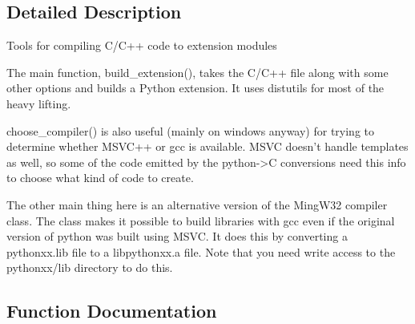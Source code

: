 \subsection{Detailed Description}
\begin{DoxyVerb}Tools for compiling C/C++ code to extension modules

The main function, build_extension(), takes the C/C++ file
along with some other options and builds a Python extension.
It uses distutils for most of the heavy lifting.

choose_compiler() is also useful (mainly on windows anyway)
for trying to determine whether MSVC++ or gcc is available.
MSVC doesn't handle templates as well, so some of the code emitted
by the python->C conversions need this info to choose what kind
of code to create.

The other main thing here is an alternative version of the MingW32
compiler class.  The class makes it possible to build libraries with
gcc even if the original version of python was built using MSVC.  It
does this by converting a pythonxx.lib file to a libpythonxx.a file.
Note that you need write access to the pythonxx/lib directory to do this.
\end{DoxyVerb}
 

\subsection{Function Documentation}
\hypertarget{namespacescipy_1_1weave_1_1build__tools_a7f26b87595b289576e414a4b29c2a308}{}
